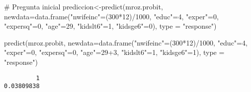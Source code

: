 \documentclass[
  letterpaper,
  DIV=11,
  numbers=noendperiod]{scrreprt}
\newenvironment{Shaded}{\begin{snugshade}}{\end{snugshade}}
\newcommand{\AttributeTok}[1]{\textcolor[rgb]{0.40,0.45,0.13}{#1}}
\newcommand{\CommentTok}[1]{\textcolor[rgb]{0.37,0.37,0.37}{#1}}
\newcommand{\DecValTok}[1]{\textcolor[rgb]{0.68,0.00,0.00}{#1}}
\newcommand{\FunctionTok}[1]{\textcolor[rgb]{0.28,0.35,0.67}{#1}}
\newcommand{\NormalTok}[1]{\textcolor[rgb]{0.00,0.23,0.31}{#1}}
\newcommand{\OtherTok}[1]{\textcolor[rgb]{0.00,0.23,0.31}{#1}}
\newcommand{\SpecialCharTok}[1]{\textcolor[rgb]{0.37,0.37,0.37}{#1}}
\newcommand{\StringTok}[1]{\textcolor[rgb]{0.13,0.47,0.30}{#1}}
\begin{document}
\begin{Shaded}
\begin{Highlighting}[]
\CommentTok{\# Pregunta inicial}
\NormalTok{prediccion}\OtherTok{\textless{}{-}}\FunctionTok{predict}\NormalTok{(mroz.probit,}
                    \AttributeTok{newdata=}\FunctionTok{data.frame}\NormalTok{(}\StringTok{"nwifeinc"}\OtherTok{=}\NormalTok{(}\DecValTok{300}\SpecialCharTok{*}\DecValTok{12}\NormalTok{)}\SpecialCharTok{/}\DecValTok{1000}\NormalTok{,}
                                       \StringTok{"educ"}\OtherTok{=}\DecValTok{4}\NormalTok{,}
                                       \StringTok{"exper"}\OtherTok{=}\DecValTok{0}\NormalTok{,}
                                       \StringTok{"expersq"}\OtherTok{=}\DecValTok{0}\NormalTok{,}
                                       \StringTok{"age"}\OtherTok{=}\DecValTok{29}\NormalTok{,}
                                       \StringTok{"kidslt6"}\OtherTok{=}\DecValTok{1}\NormalTok{,}
                                       \StringTok{"kidsge6"}\OtherTok{=}\DecValTok{0}\NormalTok{),}
                    \AttributeTok{type =} \StringTok{"response"}\NormalTok{)}

\FunctionTok{predict}\NormalTok{(mroz.probit,}
                    \AttributeTok{newdata=}\FunctionTok{data.frame}\NormalTok{(}\StringTok{"nwifeinc"}\OtherTok{=}\NormalTok{(}\DecValTok{300}\SpecialCharTok{*}\DecValTok{12}\NormalTok{)}\SpecialCharTok{/}\DecValTok{1000}\NormalTok{,}
                                       \StringTok{"educ"}\OtherTok{=}\DecValTok{4}\NormalTok{,}
                                       \StringTok{"exper"}\OtherTok{=}\DecValTok{0}\NormalTok{,}
                                       \StringTok{"expersq"}\OtherTok{=}\DecValTok{0}\NormalTok{,}
                                       \StringTok{"age"}\OtherTok{=}\DecValTok{29}\SpecialCharTok{+}\DecValTok{3}\NormalTok{,}
                                       \StringTok{"kidslt6"}\OtherTok{=}\DecValTok{1}\NormalTok{,}
                                       \StringTok{"kidsge6"}\OtherTok{=}\DecValTok{1}\NormalTok{),}
                    \AttributeTok{type =} \StringTok{"response"}\NormalTok{)}
\end{Highlighting}
\end{Shaded}

\begin{verbatim}
         1 
0.03809838 
\end{verbatim}
\end{document}
